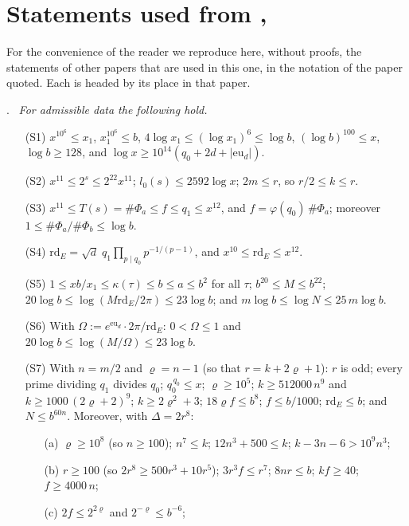 \documentclass[10pt]{amsart}
\theoremstyle{definition}
\theoremstyle{remark}
\providecommand{\anPa}{\Phi_a}
\providecommand{\anPb}{\Phi_b}
\providecommand{\aneu}{\mathrm{eu}_d}
\providecommand{\anrd}{\mathrm{rd}}
\newenvironment{quotedthm}[2]{\par\medskip\noindent\begingroup
  \textbf{#1}#2.\ \itshape\ignorespaces}{\endgroup\par\medskip}
\begin{document}
\appendix

\section{Statements used from \texorpdfstring{\cite{P46}}{[P46]}, \texorpdfstring{\cite{P51}}{[P51]}}\label{B2:quoted}

For the convenience of the reader we reproduce here, without proofs, the statements of other papers that are used in this one, in the notation of the paper quoted. Each is headed by its place in that paper.

\begin{quotedthm}{\cite[Lemma~13.4]{P46}}{}
For admissible data the following hold.
\begin{enumerate}
\item[(S1)] $x^{10^{6}}\le x_1$, $x_1^{10^{6}}\le b$,
$4\log x_1\le(\log x_1)^{6}\le\log b$,
$(\log b)^{100}\le x$, $\log b\ge128$, and
$\log x\ge10^{14}(q_0+2d+|\aneu|)$.
\item[(S2)] $x^{11}\le2^{s}\le2^{22}x^{11}$; $l_0(s)\le2592\log x$;
$2m\le r$, so $r/2\le k\le r$.
\item[(S3)] $x^{11}\le T(s)=\#\anPa\le f\le q_1\le x^{12}$, and
$f=\varphi(q_0)\,\#\anPa$; moreover $1\le\#\anPa/\#\anPb\le\log b$.
\item[(S4)] $\anrd_E=\sqrt d\;q_1\prod_{p\mid q_0}p^{-1/(p-1)}$, and
$x^{10}\le\anrd_E\le x^{12}$.
\item[(S5)] $1\le xb/x_1\le\kappa(\tau)\le b\le a\le b^{2}$ for all $\tau$;
$b^{20}\le M\le b^{22}$;
$20\log b\le\log(M\anrd_E/2\pi)\le23\log b$; and
$m\log b\le\log N\le25\,m\log b$.
\item[(S6)] With $\Omega:=e^{\aneu}\cdot2\pi/\anrd_E$: $0<\Omega\le1$ and
$20\log b\le\log(M/\Omega)\le23\log b$.
\item[(S7)] With $n=m/2$ and $\varrho=n-1$ (so that $r=k+2\varrho+1$): $r$ is odd; every prime
dividing $q_1$ divides $q_0$; $q_0^{\,q_0}\le x$; $\varrho\ge10^{5}$;
$k\ge512000\,n^{9}$ and $k\ge1000\,(2\varrho+2)^{9}$; $k\ge2\varrho^{2}+3$; $18\varrho f\le b^{8}$;
$f\le b/1000$; $\anrd_E\le b$; and $N\le b^{60n}$. Moreover, with $\Delta=2r^{8}$:
\begin{itemize}
\item[(a)] $\varrho\ge10^{8}$ (so $n\ge100$); $n^{7}\le k$; $12n^{3}+500\le k$; $k-3n-6>10^{9}n^{3}$;
\item[(b)] $r\ge100$ (so $2r^{8}\ge500r^{3}+10r^{5}$); $3r^{3}f\le r^{7}$; $8nr\le b$; $kf\ge40$; $f\ge4000\,n$;
\item[(c)] $2f\le2^{2\varrho}$ and $2^{-\varrho}\le b^{-6}$;

\end{itemize}
\end{enumerate}
\end{quotedthm}
\end{document}
